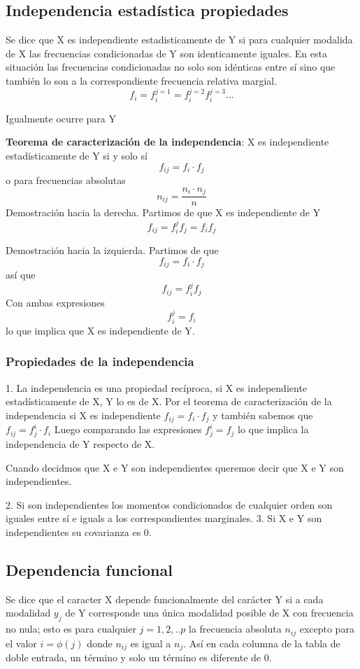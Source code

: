 \documentclass{article}
\begin{document}
 \subsection{ Independencia estadística propiedades }
 Se dice que X es independiente estadisticamente de Y si para cualquier modalida de X las frecuencias condicionadas de Y son identicamente iguales. En esta situación las frecuencias condicionadas no solo son idénticas entre sí sino que también lo son a la correspondiente frecuencia relativa margial.  
 $$ f_i = f_i^{j=1} = f_i^{j=2} f_i^{j=3} ... $$
 
 Igualmente ocurre para Y
 
 \vspace{0.5cm}
 
\textbf{Teorema de caracterización de la independencia}: X es independiente estadísticamente de Y si y solo sí $$ f_{ij} = f_i \cdot f_j $$ o para frecuencias absolutas $$n_{ij} = \frac{n_i \cdot n_j}{n}$$
 Demostración hacia la derecha. Partimos de que X es independiente de Y 
 $$ f_{ij} = f_i^j f_j = f_i f_j $$
 
 Demostración hacia la izquierda. Partimos de que $$ f_{ij} = f_i \cdot f_j $$ así que $$ f_{ij} = f_i^j f_j $$ Con ambas expresiones $$f_i^j = f_i $$ lo que implica que X es independiente de Y.
 
 \subsubsection{Propiedades de la independencia}
 
 1. La independencia es una propiedad recíproca, si X es independiente estadísticamente de X, Y lo es de X. Por el teorema de caracterización de la independencia si X es independiente $ f_{ij} = f_i \cdot f_j $ y también sabemos que $f_{ij} = f_j^i \cdot f_i$ Luego comparando las expresiones  $f_j^i = f_j $ lo que implica la independencia de Y respecto de X.
 
 Cuando decidmos que X e Y son independientes queremos decir que X e Y son independientes.
 
 2. Si son independientes los momentos condicionados de cualquier orden son iguales entre sí e iguals a los correspondientes marginales.
 3. Si X e Y son independientes su covarianza es 0.
 
\subsection{Dependencia funcional}
	Se dice que el caracter X depende funcionalmente del carácter Y si a cada modalidad $y_j$ de Y corresponde una única modalidad posible de X con frecuencia no nula; esto es para cualquier $j = 1,2, .. p$ la frecuencia absoluta $n_{ij}$ excepto para el valor $i = \phi (j)$ donde $n_{ij} $ es igual a $n_j$. Así en cada columna de la tabla de doble entrada, un término y solo un término es diferente de 0.
	
\end{document}
